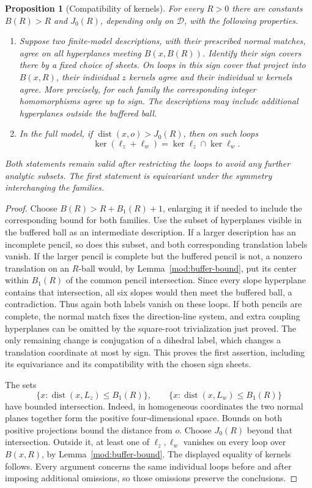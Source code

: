 \documentclass[11pt,reqno]{amsart}
\numberwithin{equation}{section}
\newtheorem{proposition}[theorem]{Proposition}
\theoremstyle{definition}
\theoremstyle{remark}
\newcommand{\cD}{\mathcal D}
\DeclareMathOperator{\dist}{dist}
\begin{document}
\begin{proposition}[Compatibility of kernels]\label{prop:kernel-compatibility}
For every $R>0$ there are constants $B(R)>R$ and $J_0(R)$, depending
only on $\cD$, with the following properties.
\begin{enumerate}
\item Suppose two finite-model descriptions, with their prescribed
normal matches, agree on all hyperplanes meeting $B(x,B(R))$.
Identify their sign covers there by a fixed choice of sheets.
On loops in this sign cover that project into $B(x,R)$, their
individual $z$ kernels agree and their individual $w$ kernels
agree.  More precisely, for each family the corresponding integer
homomorphisms agree up to sign.
The descriptions may include additional hyperplanes outside the
buffered ball.
\item In the full model, if $\dist(x,o)>J_0(R)$, then on such loops
\[
 \ker(\ell_z+\ell_w)=\ker\ell_z\cap\ker\ell_w.
\]
\end{enumerate}
Both statements remain valid after restricting the loops to avoid
any further analytic subsets.  The first statement is equivariant
under the symmetry interchanging the families.
\end{proposition}
\begin{proof}
Choose $B(R)>R+B_1(R)+1$, enlarging it if needed to include the
corresponding bound for both families.  Use the subset of hyperplanes
visible in the buffered ball as an intermediate description.
If a larger description has an incomplete pencil, so does this
subset, and both corresponding translation labels vanish.
If the larger pencil is complete but the buffered pencil is not,
a nonzero translation on an $R$-ball would, by
Lemma~\ref{mod:buffer-bound}, put its center within $B_1(R)$ of the
common pencil intersection.  Since every slope hyperplane contains
that intersection, all six slopes would then meet the buffered
ball, a contradiction.  Thus again both labels vanish on these
loops.  If both pencils are complete, the normal match fixes the
direction-line system, and extra coupling hyperplanes can be
omitted by the square-root trivialization just proved.  The only
remaining change is conjugation of a dihedral label, which changes
a translation coordinate at most by sign.  This proves the first
assertion, including its equivariance and its compatibility with
the chosen sign sheets.

The sets
\[
 \{x:\dist(x,L_z)\le B_1(R)\},\qquad
 \{x:\dist(x,L_w)\le B_1(R)\}
\]
have bounded intersection.  Indeed, in homogeneous coordinates
the two normal planes together form the positive four-dimensional
space.  Bounds on both positive projections bound the distance
from $o$.  Choose $J_0(R)$ beyond that intersection.  Outside it,
at least one of $\ell_z,\ell_w$ vanishes on every loop over
$B(x,R)$, by Lemma~\ref{mod:buffer-bound}.  The displayed equality
of kernels follows.  Every argument concerns the same individual
loops before and after imposing additional omissions, so those
omissions preserve the conclusions.
\end{proof}
\end{document}
